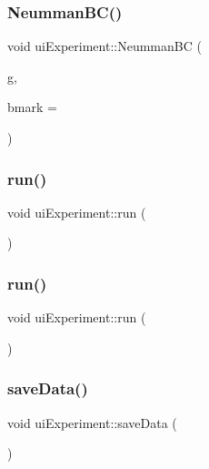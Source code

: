 \subsubsection{\texorpdfstring{Neumman\+B\+C()}{NeummanBC()}\hspace{0.1cm}{\footnotesize\ttfamily [2/2]}}
{\footnotesize\ttfamily void ui\+Experiment\+::\+Neumman\+BC (\begin{DoxyParamCaption}\item[{\mbox{\hyperlink{complex__node___t_h_f_e_m_2emdefs_8h_af8816f473dfdd972d676674921eb65f3}{C\+Func}}}]{g,  }\item[{int}]{bmark = {} }\end{DoxyParamCaption})}

\mbox{\label{classui_experiment_aab82b5571ffb6a05e3104b7fc50ca34a}} 
\subsubsection{\texorpdfstring{run()}{run()}\hspace{0.1cm}{\footnotesize\ttfamily [1/2]}}
{\footnotesize\ttfamily void ui\+Experiment\+::run (\begin{DoxyParamCaption}{ }\end{DoxyParamCaption})}

\mbox{\label{classui_experiment_aab82b5571ffb6a05e3104b7fc50ca34a}} 
\subsubsection{\texorpdfstring{run()}{run()}\hspace{0.1cm}{\footnotesize\ttfamily [2/2]}}
{\footnotesize\ttfamily void ui\+Experiment\+::run (\begin{DoxyParamCaption}{ }\end{DoxyParamCaption})}

\mbox{\label{classui_experiment_a62f19f7927000e2b2b6946513917aef4}} 
\subsubsection{\texorpdfstring{save\+Data()}{saveData()}\hspace{0.1cm}{\footnotesize\ttfamily [1/2]}}
{\footnotesize\ttfamily void ui\+Experiment\+::save\+Data (\begin{DoxyParamCaption}{ }\end{DoxyParamCaption})\hspace{0.3cm}{\ttfamily [virtual]}}

